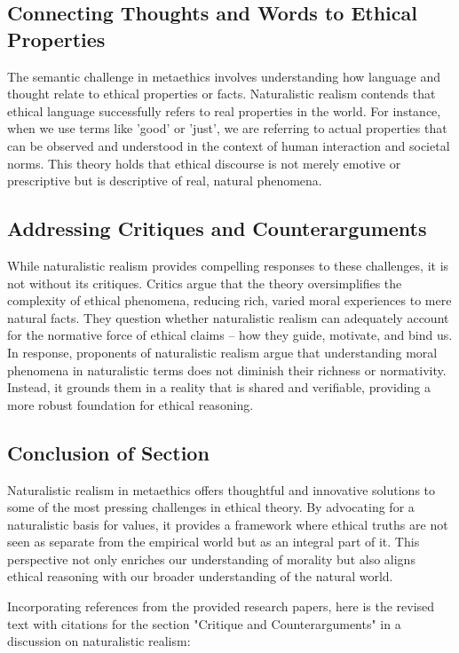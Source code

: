 \documentclass[12pt,a4paper]{article}
\begin{document}
\subsection{Connecting Thoughts and Words to Ethical Properties}
The semantic challenge in metaethics involves understanding how language and thought relate to ethical properties or facts. Naturalistic realism contends that ethical language successfully refers to real properties in the world. For instance, when we use terms like 'good' or 'just', we are referring to actual properties that can be observed and understood in the context of human interaction and societal norms. This theory holds that ethical discourse is not merely emotive or prescriptive but is descriptive of real, natural phenomena.

\subsection{Addressing Critiques and Counterarguments}
While naturalistic realism provides compelling responses to these challenges, it is not without its critiques. Critics argue that the theory oversimplifies the complexity of ethical phenomena, reducing rich, varied moral experiences to mere natural facts. They question whether naturalistic realism can adequately account for the normative force of ethical claims – how they guide, motivate, and bind us. In response, proponents of naturalistic realism argue that understanding moral phenomena in naturalistic terms does not diminish their richness or normativity. Instead, it grounds them in a reality that is shared and verifiable, providing a more robust foundation for ethical reasoning.

\subsection{Conclusion of Section}
Naturalistic realism in metaethics offers thoughtful and innovative solutions to some of the most pressing challenges in ethical theory. By advocating for a naturalistic basis for values, it provides a framework where ethical truths are not seen as separate from the empirical world but as an integral part of it. This perspective not only enriches our understanding of morality but also aligns ethical reasoning with our broader understanding of the natural world.

Incorporating references from the provided research papers, here is the revised text with citations for the section "Critique and Counterarguments" in a discussion on naturalistic realism:
\end{document}
